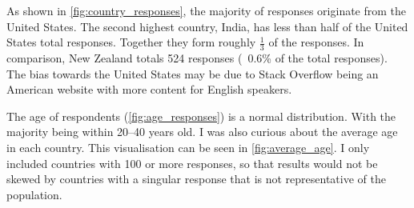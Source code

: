 \documentclass[listof=totoc]{scrartcl}
\begin{document}
As shown in \autoref{fig:country_responses}, the majority of responses originate from the United States. The second highest country, India, has less than half of the United States total responses. Together they form roughly \(\frac{1}{3}\) of the responses. In comparison, New Zealand totals \num{524} responses (~0.6\% of the total responses). The bias towards the United States may be due to Stack Overflow being an American website with more content for English speakers.

The age of respondents (\autoref{fig:age_responses}) is a normal distribution. With the majority being within \numrange{20}{40} years old. I was also curious about the average age in each country. This visualisation can be seen in \autoref{fig:average_age}. I only included countries with 100 or more responses, so that results would not be skewed by countries with a singular response that is not representative of the population.
\end{document}
